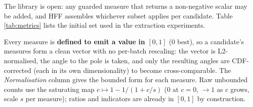\documentclass[sigconf]{acmart}
\begin{document}
The library is open: any guarded measure that returns a non-negative scalar may
be added, and HFF assembles whichever subset applies per candidate. Table~%
\ref{tab:metrics} lists the initial set used in the extraction experiments.

Every measure is \textbf{defined to emit a value in $[0,1]$} (0 best), so a
candidate's measures form a clean vector with no per-batch rescaling: the vector
is L2-normalised, the angle to the pole is taken, and only the resulting angles
are CDF-corrected (each in its own dimensionality) to become cross-comparable.
The \emph{Normalisation} column gives the bounded form for each measure. Raw
unbounded counts use the saturating map $c \mapsto 1 - 1/(1+c/s)$ (0 at $c=0$,
$\to 1$ as $c$ grows, scale $s$ per measure); ratios and indicators are already
in $[0,1]$ by construction.
\end{document}
